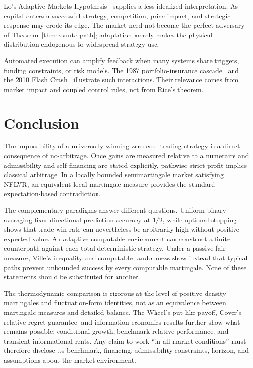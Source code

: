\documentclass[aps,pra,reprint,superscriptaddress,amsmath,amssymb]{revtex4-2}
\theoremstyle{plain}
\theoremstyle{definition}
\theoremstyle{remark}
\begin{document}
Lo's Adaptive Markets Hypothesis~\cite{Lo2004} supplies a less idealized
interpretation. As capital enters a successful strategy, competition, price
impact, and strategic response may erode its edge. The market need not become
the perfect adversary of Theorem~\ref{thm:counterpath}; adaptation merely makes
the physical distribution endogenous to widespread strategy use.

Automated execution can amplify feedback when many systems share triggers,
funding constraints, or risk models. The 1987 portfolio-insurance
cascade~\cite{Brady1988} and the 2010 Flash Crash~\cite{Kirilenko2017} illustrate
such interactions. Their relevance comes from market impact and coupled
control rules, not from Rice's theorem.

\section{Conclusion}
\label{sec:conclusion}

The impossibility of a universally winning zero-cost trading strategy is a
direct consequence of no-arbitrage. Once gains are measured relative to a
numeraire and admissibility and self-financing are stated explicitly,
pathwise strict profit implies classical arbitrage. In a locally bounded
semimartingale market satisfying NFLVR, an equivalent local martingale measure
provides the standard expectation-based contradiction.

The complementary paradigms answer different questions. Uniform binary
averaging fixes directional prediction accuracy at \(1/2\), while optional
stopping shows that trade win rate can nevertheless be arbitrarily high
without positive expected value. An adaptive computable environment can
construct a finite counterpath against each total deterministic strategy.
Under a passive fair measure, Ville's inequality and computable randomness
show instead that typical paths prevent unbounded success by every computable
martingale. None of these statements should be substituted for another.

The thermodynamic comparison is rigorous at the level of positive density
martingales and fluctuation-form identities, not as an equivalence between
martingale measures and detailed balance. The Wheel's put-like payoff,
Cover's relative-regret guarantee, and information-economics results further
show what remains possible: conditional growth, benchmark-relative
performance, and transient informational rents. Any claim to work ``in all
market conditions'' must therefore disclose its benchmark, financing,
admissibility constraints, horizon, and assumptions about the market
environment.
\end{document}
